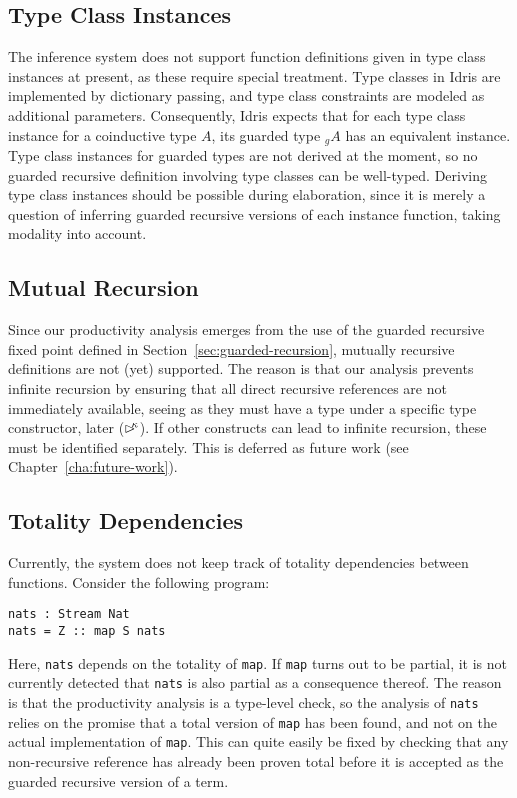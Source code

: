 \subsection{Type Class Instances}
\label{sec:type-class-instances}
The inference system does not support function definitions given in type class
instances at present, as these require special treatment. Type classes in Idris
are implemented by dictionary passing, and type class constraints are modeled as
additional parameters. Consequently, Idris expects that for each type class
instance for a coinductive type $A$, its guarded type $_gA$ has an equivalent
instance. Type class instances for guarded types are not derived at the moment,
so no guarded recursive definition involving type classes can be
well-typed. Deriving type class instances should be possible during elaboration,
since it is merely a question of inferring guarded recursive versions of each
instance function, taking modality into account.


\subsection{Mutual Recursion}
\label{sec:mutual-recursion}
Since our productivity analysis emerges from the use of the guarded recursive
fixed point defined in Section~\ref{sec:guarded-recursion}, mutually recursive
definitions are not (yet) supported. The reason is that our analysis prevents
infinite recursion by ensuring that all direct recursive references are not
immediately available, seeing as they must have a type under a specific type
constructor, later ($\rhd^{\!\!\kappa}$). If other constructs can lead to infinite
recursion, these must be identified separately. This is deferred as future work
(see Chapter~\ref{cha:future-work}).

\subsection{Totality Dependencies}
\label{sec:total-depend}
Currently, the system does not keep track of totality dependencies between
functions. Consider the following program:
\begin{lstlisting}[mathescape, title=\idrisBlock]
nats : Stream Nat
nats = Z :: map S nats
\end{lstlisting}
Here, \texttt{nats} depends on the totality of \texttt{map}. If \texttt{map}
turns out to be partial, it is not currently detected that \texttt{nats} is also
partial as a consequence thereof. The reason is that the productivity analysis
is a type-level check, so the analysis of \texttt{nats} relies on the promise that
a total version of \texttt{map} has been found, and not on the actual
implementation of \texttt{map}. This can quite easily be fixed by checking that
any non-recursive reference has already been proven total before it is accepted
as the guarded recursive version of a term.

